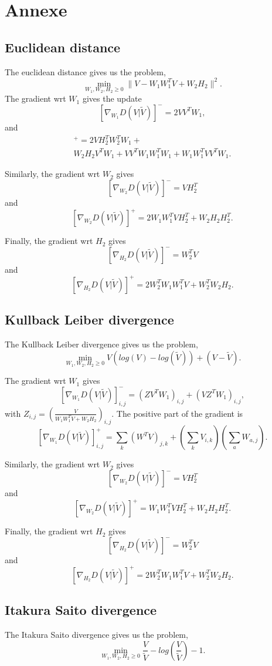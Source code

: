 
\section*{Annexe}

\subsection{Euclidean distance}
\label{euclidisteq}

The euclidean distance gives us the problem,
$$\min_{W_1,W_2,H_2 \geq 0} \|V - W_{1}W_{1}^{T}V + W_{2} H_{2} \|^2.$$
The gradient wrt $W_1$ gives the update
$$[\nabla_{W_1} D(V|\tilde{V})]^{-} = 2 VV^TW_1, $$
and
\begin{align*}
[\nabla_{W_1} D(V|\tilde{V})]^{+} = 2VH_2^TW_2^TW_1 +  \\  W_2H_2V^TW_1 +  VV^TW_1W_1^TW_1 + W_1W_1^TVV^TW_1.
\end{align*}

Similarly, the gradient wrt $W_2$ gives
$$ [\nabla_{W_2} D(V|\tilde{V})]^{-} = VH_2^T $$
and
$$ [\nabla_{W_2} D(V|\tilde{V})]^{+} = 2W_1W_1^TVH_2^T + W_2H_2H_2^T.$$

Finally, the gradient wrt $H_2$ gives
$$ [\nabla_{H_2} D(V|\tilde{V})]^{-} = W_2^TV  $$
and
$$ [\nabla_{H_2} D(V|\tilde{V})]^{+} = 2W_2^TW_1W_1^TV + W_2^TW_2H_2. $$


\subsection{Kullback Leiber divergence}\label{KLdisteq}
The Kullback Leiber divergence gives us the problem,
$$\min_{W_1,W_2,H_2 \geq 0} V(log(V) - log(\tilde{V})) + (V-\tilde{V}).$$

The gradient wrt $W_1$ gives
$$[\nabla_{W_1} D(V|\tilde{V})]_{i,j}^{-} = (ZV^TW_1)_{i,j} + (VZ^TW_1)_{i,j},$$
with $Z_{i,j} = (\frac{V}{W_1W_1^TV + W_2H_2})_{i,j}$. The positive part of the gradient is
$$[\nabla_{W_1} D(V|\tilde{V})]^{+}_{i,j} = \sum_k(W^TV)_{j,k} + (\sum_{k}V_{i,k})(\sum_a W_{a,j}).$$


Similarly, the gradient wrt $W_2$ gives
$$ [\nabla_{W_2} D(V|\tilde{V})]^{-} = VH_2^T $$
and
$$ [\nabla_{W_2} D(V|\tilde{V})]^{+} = W_1W_1^TVH_2^T + W_2H_2H_2^T.$$

Finally, the gradient wrt $H_2$ gives
$$ [\nabla_{H_2} D(V|\tilde{V})]^{-} = W_2^TV  $$
and
$$ [\nabla_{H_2} D(V|\tilde{V})]^{+} = 2W_2^TW_1W_1^TV + W_2^TW_2H_2. $$

 
\subsection{Itakura Saito divergence}\label{ISdisteq}
The Itakura Saito divergence gives us the problem,
$$\min_{W_1,W_2,H_2 \geq 0} \frac{V}{\tilde{V}} - log(\frac{V}{\tilde{V}}) -1.$$

